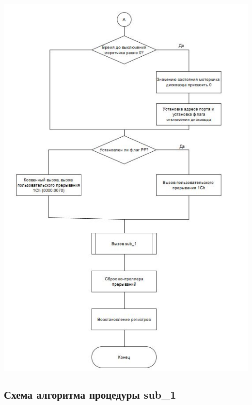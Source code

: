 \documentclass[a4paper,12pt]{article}
\begin{document}
\begin{flushright}
	\includegraphics[scale=1]{scheme2.JPG}
\end{flushright}

\clearpage
\subsection{Схема алгоритма процедуры sub\_1}
\end{document}
